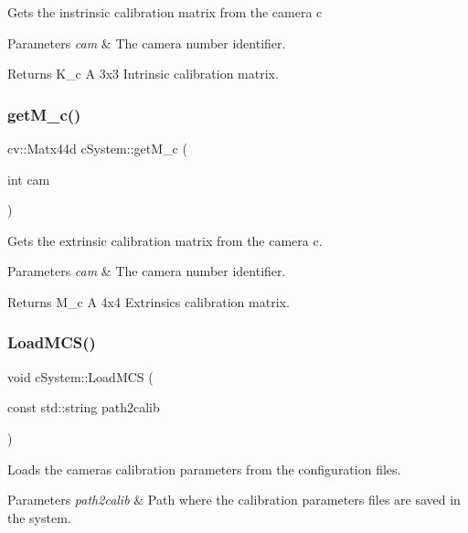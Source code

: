 Gets the instrinsic calibration matrix from the camera c 
\begin{DoxyParams}{Parameters}
{\em cam} & The camera number identifier. \\
\hline
\end{DoxyParams}
\begin{DoxyReturn}{Returns}
K\+\_\+c A 3x3 Intrinsic calibration matrix. 
\end{DoxyReturn}
\mbox{\label{classcSystem_ad98d9a5cca9c20536605a7e7800db04f}} 
\subsubsection{\texorpdfstring{get\+M\+\_\+c()}{getM\_c()}}
{\footnotesize\ttfamily cv\+::\+Matx44d c\+System\+::get\+M\+\_\+c (\begin{DoxyParamCaption}\item[{int}]{cam }\end{DoxyParamCaption})}

Gets the extrinsic calibration matrix from the camera c. 
\begin{DoxyParams}{Parameters}
{\em cam} & The camera number identifier. \\
\hline
\end{DoxyParams}
\begin{DoxyReturn}{Returns}
M\+\_\+c A 4x4 Extrinsics calibration matrix. 
\end{DoxyReturn}
\mbox{\label{classcSystem_adf0d3a26903fdcbf038e2d2f4334f60f}} 
\subsubsection{\texorpdfstring{Load\+M\+C\+S()}{LoadMCS()}}
{\footnotesize\ttfamily void c\+System\+::\+Load\+M\+CS (\begin{DoxyParamCaption}\item[{const std\+::string}]{path2calib }\end{DoxyParamCaption})}



Loads the cameras calibration parameters from the configuration files. 


\begin{DoxyParams}{Parameters}
{\em path2calib} & Path where the calibration parameters files are saved in the system. \\
\hline
\end{DoxyParams}
\mbox{\label{classcSystem_a2cc39fd195d94873333c459da47d8244}} 
